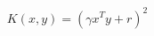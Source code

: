 \documentclass[preview]{standalone}
\begin{document}
\begin{align*}
K(x, y) = (\gamma x^T y + r)^2
\end{align*}
\end{document}
